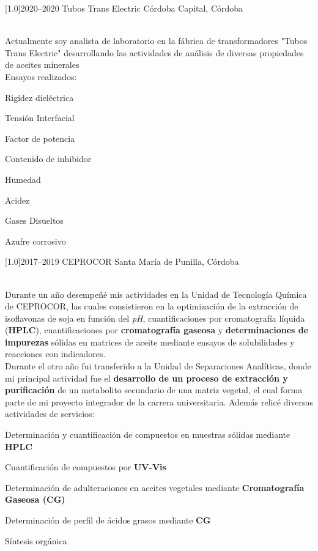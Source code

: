 \documentclass[espanol]{cv-style}     %
\begin{document}
\begin{entrylist}
\entry
  {\scalebox{.7}[1.0]{2020--2020}}
  {Tubos Trans Electric}
  {Córdoba Capital, Córdoba}
  {\\
	  Actualmente soy analista de laboratorio en la fábrica de transformadores {"Tubos Trans Electric"} desarrollando las actividades de análisis de diversas propiedades de aceites minerales \\
  Ensayos realizados:
  \begin{itemize}\small{
      \item Rigidez dieléctrica
      \item Tensión Interfacial
      \item Factor de potencia
      \item Contenido de inhibidor
      \item Humedad
      \item Acidez
      \item Gases Disueltos
      \item Azufre corrosivo}
  \end{itemize}
  }

\entry
  {\scalebox{.8}[1.0]{2017--2019}}
  {CEPROCOR}
  {Santa María de Punilla, Córdoba}
  {\\
  Durante un año desempeñé mis actividades en la Unidad de Tecnología Química de CEPROCOR, las cuales consistieron en la optimización de la extracción de isoflavonas de soja en función del \textit{pH}, cuantificaciones por cromatografía líquida (\textbf{HPLC}), cuantificaciones por \textbf{cromatografía gaseosa} y \textbf{determinaciones de impurezas} sólidas en matrices de aceite mediante ensayos de solubilidades y reacciones con indicadores. \\
  Durante el otro año fui transferido a la Unidad de Separaciones Analíticas, donde mi principal actividad fue el \textbf{desarrollo de un proceso de extracción y purificación} de un metabolito secundario de una matriz vegetal, el cual forma parte de mi proyecto integrador de la carrera universitaria.
  Además relicé diversas actividades de servicios:
  \begin{itemize}\small{
  \item Determinación y cuantificación de compuestos en muestras sólidas mediante \textbf{HPLC}
  \item Cuantificación de compuestos por \textbf{UV-Vis}
  \item Determinación de adulteraciones en aceites vegetales mediante \textbf{Cromatografía Gaseosa (CG)}
  \item Determinación de perfil de ácidos grasos mediante \textbf{CG}
  \item Síntesis orgánica
  }
  \end{itemize}
  }


\end{entrylist}
\end{document}
